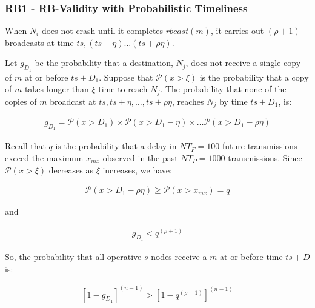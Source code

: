         \subsubsection*{RB1 - RB-Validity with Probabilistic Timeliness}
        When $N_i$ does not crash until it completes $rbcast(m)$, it carries out $(\rho + 1)$ broadcasts at time $ts, (ts + \eta) \ldots (ts + \rho\eta)$.
        
        Let $g_{D_1}$ be the probability that a destination, $N_j$, does not receive a single copy of $m$ at or before $ts + D_1$.  Suppose that $\mathcal{P}(x > \xi)$ is the probability that a copy of $m$ takes longer than $\xi$ time to reach $N_{j}$.  The probability that none of the copies of $m$ broadcast at $ts, ts+\eta, \ldots,  ts+\rho \eta$, reaches $N_{j}$ by time $ts+D_1$, is:
        
        \begin{equation}
            \begin{aligned}
                g_{D_1}= \mathcal{P}(x > D_1) \times \mathcal{P}(x > D_1 - \eta) \times \ldots \mathcal{P}(x > D_1 - \rho \eta)
            \end{aligned}
        \end{equation}

        
        Recall that $q$ is the probability that a delay in $NT_F=100$ future transmissions exceed the maximum $x_{mx}$ observed in the past $NT_P=1000$ transmissions. Since $\mathcal{P}(x > \xi)$ decreases as $\xi$ increases, we have:
        
        \begin{equation}
            \begin{aligned}
                \mathcal{P}(x > D_1 - \rho \eta) \geq \mathcal{P}(x > x_{mx}) = q
            \end{aligned}
        \end{equation}
        
    and

        \begin{equation}
            \begin{aligned}
                g_{D_1} < q^{(\rho + 1)}
            \end{aligned}
        \end{equation}        
        
    So, the probability that all operative $s$-nodes receive a $m$ at or before time $ts + D$ is:        

        \begin{equation}\label{eq:rb_validity}
            \begin{aligned}                
                \left[1 - g_{D_1}\right] ^ {(n - 1)} > \left[1 - q ^ {(\rho + 1)} \right] ^{(n - 1)}
            \end{aligned}
        \end{equation}
        
